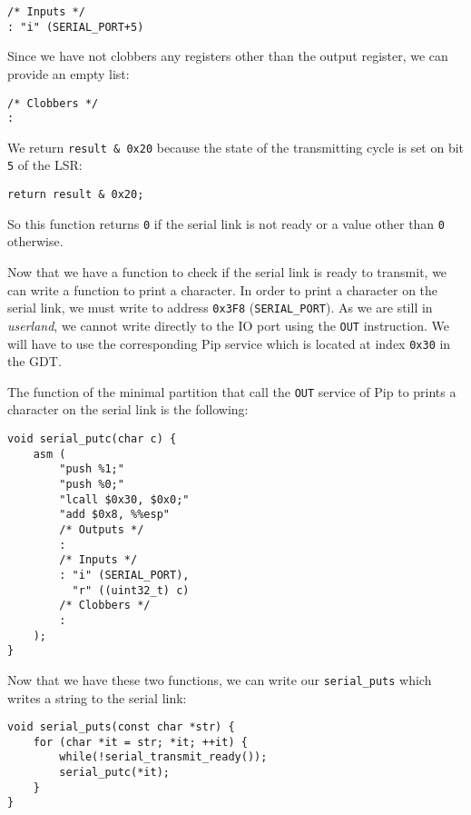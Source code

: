 \documentclass[10pt,a4paper,titlepage]{refart}
\begin{document}
\begin{lstlisting}[style=CStyle]
/* Inputs */
: "i" (SERIAL_PORT+5)
\end{lstlisting}

Since we have not clobbers any registers other than the output register, we can
provide an empty list:

\begin{lstlisting}[style=CStyle]
/* Clobbers */
:
\end{lstlisting}

We return \texttt{result \& 0x20} because the state of the transmitting cycle is
set on bit \texttt{5} of the LSR:

\begin{lstlisting}[style=CStyle]
return result & 0x20;
\end{lstlisting}

So this function returns \texttt{0} if the serial link is not ready or a value
other than \texttt{0} otherwise.

Now that we have a function to check if the serial link is ready to transmit, we
can write a function to print a character. In order to print a character on the
serial link, we must write to address \texttt{0x3F8} (\texttt{SERIAL\_PORT}). As
we are still in \textit{userland}, we cannot write directly to the IO port using
the \texttt{OUT} instruction. We will have to use the corresponding Pip service
which is located at index \texttt{0x30} in the GDT.

The function of the minimal partition that call the \texttt{OUT} service of Pip
to prints a character on the serial link is the following:

\begin{lstlisting}[style=CStyle]
void serial_putc(char c) {
    asm (
        "push %1;"
        "push %0;"
        "lcall $0x30, $0x0;"
        "add $0x8, %%esp"
        /* Outputs */
        :
        /* Inputs */
        : "i" (SERIAL_PORT),
          "r" ((uint32_t) c)
        /* Clobbers */
        :
    );
}
\end{lstlisting}

Now that we have these two functions, we can write our \texttt{serial\_puts}
which writes a string to the serial link:

\begin{lstlisting}[style=CStyle]
void serial_puts(const char *str) {
    for (char *it = str; *it; ++it) {
        while(!serial_transmit_ready());
        serial_putc(*it);
    }
}
\end{lstlisting}
\end{document}
